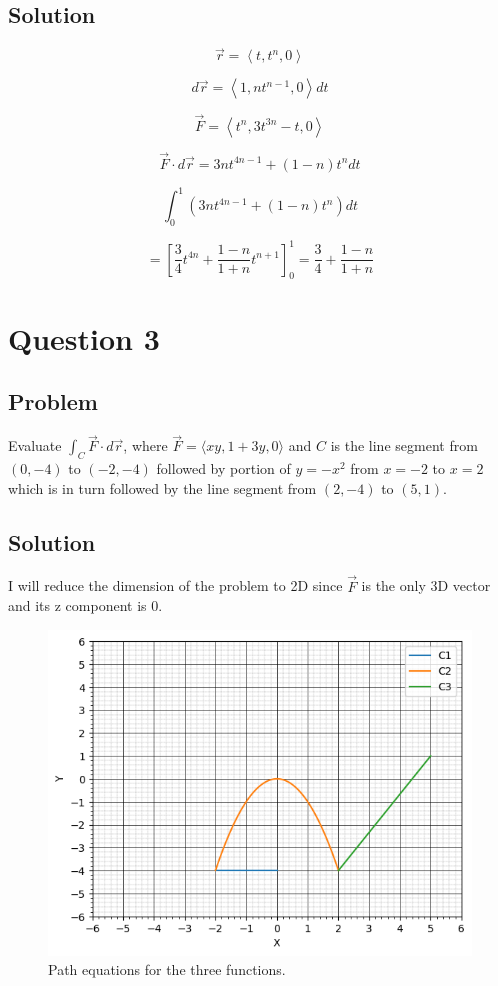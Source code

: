 \documentclass[12pt]{article}
\begin{document}
\subsection{Solution}

\[
    \vec{r} = \left\langle t, t^n, 0\right\rangle
\]

\[
    d \vec{r} = \left\langle 1, n t^{n - 1}, 0\right\rangle d t
\]

\[
    \vec{F} = \left\langle t^n, 3t^{3n} - t, 0\right\rangle
\]

\[
    \vec{F} \cdot d \vec{r} = 3 n t^{4n - 1} + (1 - n) t^n d t
\]

\[
    \int_{0}^{1} \left(3 n t^{4n - 1} + (1 - n) t^n\right) d t
\]

\[
    = \left[\frac{3}{4} t^{4n} + \frac{1 - n}{1 + n} t^{n + 1}\right]_{0}^{1}
    = \frac{3}{4} + \frac{1 - n}{1 + n}
\]

\newpage
\section{Question 3}

\subsection{Problem}

Evaluate \(\int_C \vec{F} \cdot d \vec{r}\), where \(\vec{F} = \langle xy, 1 + 3y, 0\rangle \) and
\(C\) is the line segment from \((0, -4)\) to \((-2, -4)\) followed by portion of \(y = -x^2\)
from \(x = -2\) to \(x = 2\) which is in turn followed by the line segment from \((2, -4)\)
to \((5, 1)\).

\subsection{Solution}

I will reduce the dimension of the problem to 2D since \(\vec{F}\) is the
only 3D vector and its z component is 0.

\begin{figure}[H]
    \includegraphics[width=\linewidth]{Q3.png}
    \caption{Path equations for the three functions.\cite{El-Deeb_PEU-218_Assignments_py}}\label{fig:Q3}
\end{figure}
\end{document}
